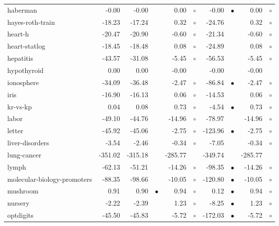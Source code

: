 {\begin{longtable}{lrr@{\hspace{0.1cm}}cr@{\hspace{0.1cm}}cr@{\hspace{0.1cm}}cr@{\hspace{0.1cm}}c}
haberman &   -0.00 &   -0.00 &           &    0.00 &  $\circ$ &   -0.00 & $\bullet$ &    0.00 &  $\circ$\\
hayes-roth-train &  -18.23 &  -17.24 &           &    0.32 &  $\circ$ &  -24.76 &           &    0.32 &  $\circ$\\
heart-h &  -20.47 &  -20.90 &           &   -0.60 &  $\circ$ &  -21.34 &           &   -0.60 &  $\circ$\\
heart-statlog &  -18.45 &  -18.48 &           &    0.08 &  $\circ$ &  -24.89 &           &    0.08 &  $\circ$\\
hepatitis &  -43.57 &  -31.08 &           &   -5.45 &  $\circ$ &  -56.53 &           &   -5.45 &  $\circ$\\
hypothyroid &    0.00 &    0.00 &           &   -0.00 &          &   -0.00 &           &   -0.00 &         \\
ionosphere &  -34.09 &  -36.48 &           &   -2.47 &  $\circ$ &  -86.84 & $\bullet$ &   -2.47 &  $\circ$\\
iris &  -16.90 &  -16.13 &           &    0.06 &  $\circ$ &  -14.53 &           &    0.06 &  $\circ$\\
kr-vs-kp &    0.04 &    0.08 &           &    0.73 &  $\circ$ &   -4.54 & $\bullet$ &    0.73 &  $\circ$\\
labor &  -49.10 &  -44.76 &           &  -14.96 &  $\circ$ &  -78.97 &           &  -14.96 &  $\circ$\\
letter &  -45.92 &  -45.06 &           &   -2.75 &  $\circ$ & -123.96 & $\bullet$ &   -2.75 &  $\circ$\\
liver-disorders &   -3.54 &   -2.46 &           &   -0.34 &  $\circ$ &   -7.05 &           &   -0.34 &  $\circ$\\
lung-cancer & -351.02 & -315.18 &           & -285.77 &          & -349.74 &           & -285.77 &         \\
lymph &  -62.13 &  -51.21 &           &  -14.26 &  $\circ$ &  -98.35 & $\bullet$ &  -14.26 &  $\circ$\\
molecular-biology-promoters &  -88.35 &  -98.66 &           &  -10.05 &  $\circ$ & -120.80 & $\bullet$ &  -10.05 &  $\circ$\\
mushroom &    0.91 &    0.90 & $\bullet$ &    0.94 &  $\circ$ &    0.12 & $\bullet$ &    0.94 &  $\circ$\\
nursery &   -2.22 &   -2.39 &           &    1.23 &  $\circ$ &   -8.25 & $\bullet$ &    1.23 &  $\circ$\\
optdigits &  -45.50 &  -45.83 &           &   -5.72 &  $\circ$ & -172.03 & $\bullet$ &   -5.72 &  $\circ$\\

\end{longtable}}
